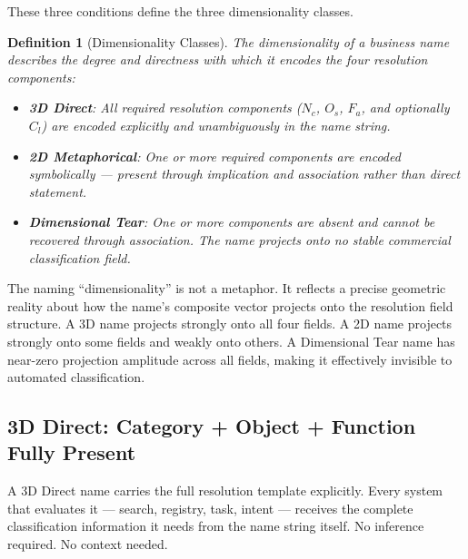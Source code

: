\documentclass[12pt, openany]{book}
\theoremstyle{thmstyle}
\theoremstyle{defstyle}
\newtheorem{definition}{Definition}[chapter]
\begin{document}
These three conditions define the three dimensionality classes.

\begin{definition}[Dimensionality Classes]
The dimensionality of a business name describes the degree and directness with which it encodes the four resolution components:
\begin{itemize}[leftmargin=1.5em]
  \item \textbf{3D Direct}: All required resolution components ($N_c$, $O_s$, $F_a$, and optionally $C_l$) are encoded explicitly and unambiguously in the name string.
  \item \textbf{2D Metaphorical}: One or more required components are encoded symbolically --- present through implication and association rather than direct statement.
  \item \textbf{Dimensional Tear}: One or more components are absent and cannot be recovered through association. The name projects onto no stable commercial classification field.
\end{itemize}
\end{definition}

The naming ``dimensionality'' is not a metaphor. It reflects a precise geometric reality about how the name's composite vector projects onto the resolution field structure. A 3D name projects strongly onto all four fields. A 2D name projects strongly onto some fields and weakly onto others. A Dimensional Tear name has near-zero projection amplitude across all fields, making it effectively invisible to automated classification.

\subsection{3D Direct: Category + Object + Function Fully Present}

A 3D Direct name carries the full resolution template explicitly. Every system that evaluates it --- search, registry, task, intent --- receives the complete classification information it needs from the name string itself. No inference required. No context needed.
\end{document}
